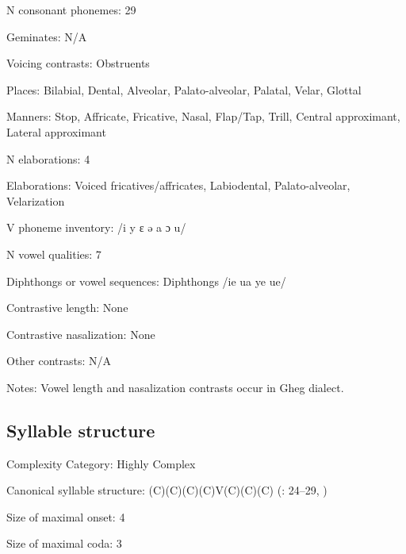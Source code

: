 {\begin{appendixdesc}
\item[N consonant phonemes:] 29

\item[Geminates:] N/A

\item[Voicing contrasts:] Obstruents

\item[Places:] Bilabial, Dental, Alveolar, Palato-alveolar, Palatal, Velar, Glottal

\item[Manners:] Stop, Affricate, Fricative, Nasal, Flap/Tap, Trill, Central approximant, Lateral approximant

\item[N elaborations:] 4

\item[Elaborations:] Voiced fricatives/affricates, Labiodental, Palato-alveolar, Velarization

\item[V phoneme inventory:] /i y ɛ ə a ɔ u/

\item[N vowel qualities:] 7

\item[Diphthongs or vowel sequences:] Diphthongs /ie ua ye ue/

\item[Contrastive length:] None

\item[Contrastive nasalization:] None

\item[Other contrasts:] N/A

\item[Notes:] Vowel length and nasalization contrasts occur in Gheg dialect.
\end{appendixdesc}
\subsection*{Syllable structure}
\begin{appendixdesc}

\item[Complexity Category:] Highly Complex

\item[Canonical syllable structure:] (C)(C)(C)(C)V(C)(C)(C) (\citealt{Newmark1957}: 24--29, \citealt{Klippenstein2010})

\item[Size of maximal onset:] 4

\item[Size of maximal coda:] 3


\end{appendixdesc}}
